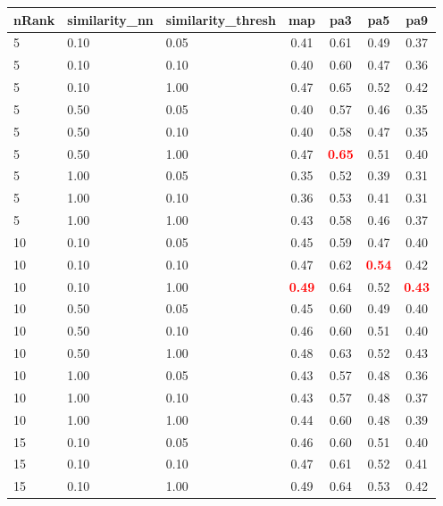 \documentclass[12pt,a4paper,fleqn]{tufte-handout}
\begin{document}
 
\begin{table}             
\begin{center}             
\scriptsize             
\setlength{\tabcolsep}{.16667em}             
\begin{tabular}{lllcccc}             
nRank & similarity\_nn & similarity\_thresh & map & pa3 & pa5 & pa9 \\             
\hline             
5 & 0.10 & 0.05 & 0.41 & 0.61 & 0.49 & 0.37 \\             
5 & 0.10 & 0.10 & 0.40 & 0.60 & 0.47 & 0.36 \\             
5 & 0.10 & 1.00 & 0.47 & 0.65 & 0.52 & 0.42 \\             
5 & 0.50 & 0.05 & 0.40 & 0.57 & 0.46 & 0.35 \\             
5 & 0.50 & 0.10 & 0.40 & 0.58 & 0.47 & 0.35 \\             
5 & 0.50 & 1.00 & 0.47 & \textbf{\textcolor{red}{0.65}} & 0.51 & 0.40 \\             
5 & 1.00 & 0.05 & 0.35 & 0.52 & 0.39 & 0.31 \\             
5 & 1.00 & 0.10 & 0.36 & 0.53 & 0.41 & 0.31 \\             
5 & 1.00 & 1.00 & 0.43 & 0.58 & 0.46 & 0.37 \\             
10 & 0.10 & 0.05 & 0.45 & 0.59 & 0.47 & 0.40 \\             
10 & 0.10 & 0.10 & 0.47 & 0.62 & \textbf{\textcolor{red}{0.54}} & 0.42 \\             
10 & 0.10 & 1.00 & \textbf{\textcolor{red}{0.49}} & 0.64 & 0.52 & \textbf{\textcolor{red}{0.43}} \\             
10 & 0.50 & 0.05 & 0.45 & 0.60 & 0.49 & 0.40 \\             
10 & 0.50 & 0.10 & 0.46 & 0.60 & 0.51 & 0.40 \\             
10 & 0.50 & 1.00 & 0.48 & 0.63 & 0.52 & 0.43 \\             
10 & 1.00 & 0.05 & 0.43 & 0.57 & 0.48 & 0.36 \\             
10 & 1.00 & 0.10 & 0.43 & 0.57 & 0.48 & 0.37 \\             
10 & 1.00 & 1.00 & 0.44 & 0.60 & 0.48 & 0.39 \\             
15 & 0.10 & 0.05 & 0.46 & 0.60 & 0.51 & 0.40 \\             
15 & 0.10 & 0.10 & 0.47 & 0.61 & 0.52 & 0.41 \\             
15 & 0.10 & 1.00 & 0.49 & 0.64 & 0.53 & 0.42 \\             

\end{tabular}
\end{center}
\end{table}
\end{document}
